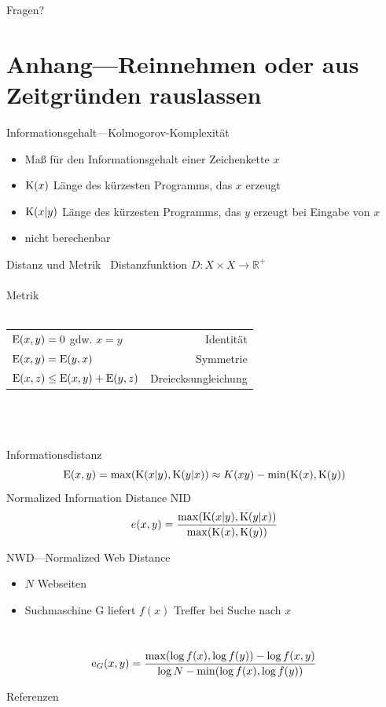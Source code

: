 \documentclass[aspectratio=1610,handout]{beamer}
\newcommand{\K}[1]{\textnormal{K}{(#1)}}
\newcommand{\E}[1]{\textnormal{E}{(#1)}}
\newcommand{\D}[1]{\textnormal{E}{(#1)}}
\newcommand{\f}[1]{\ensuremath{f(#1)}}
\begin{document}
\begin{frame}{Fragen?}
\end{frame}

\section{Anhang---Reinnehmen oder aus Zeitgründen rauslassen}

\begin{frame}{Informationsgehalt---Kolmogorov-Komplexität}
\begin{itemize}
\item Maß für den Informationsgehalt einer Zeichenkette $x$
\item $\K{x}$ Länge des kürzesten Programms, das $x$ erzeugt
\item $\K{x|y}$ Länge des kürzesten Programms, das $y$ erzeugt bei Eingabe von $x$
\item nicht berechenbar
\end{itemize}
\end{frame}

\begin{frame}{Distanz und Metrik~\cite{normalizedinformationdistance}}
Distanzfunktion $D: X \times  X \rightarrow \mathbb{R}^+$\\
\pause
~\\
Metrik\\~\\
\begin{tabular}{lr}
$\D{x,y} = 0$ gdw. $x = y$			&Identität\\
$\D{x,y} = \D{y,x}$					&Symmetrie\\
$\D{x,z} \leq \D{x,y} + \D{y,z}$	&Dreiecksungleichung\\
\end{tabular}\\
\pause
~\\~\\Informationsdistanz
\[\E{x,y} = \max(\K{x|y},\K{y|x}) \approx K(xy) - \min(\K{x},\K{y}) \]
\pause
Normalized Information Distance NID\\
\[e(x,y) = \frac{\max(\K{x|y},\K{y|x})}{\max(\K{x},\K{y})} \]
\end{frame}

\begin{frame}{NWD---Normalized Web Distance}
\begin{itemize}
\item $N$ Webseiten
\item Suchmaschine G liefert $\f{x}$ Treffer bei Suche nach $x$
\end{itemize}
~\\
\[\textnormal{e}_G(x,y) = \frac
{\max(\log \f{x}, \log \f{y})- \log \f{x,y}}
{\log N - \min(\log \f{x}, \log \f{y})}
\]
\end{frame}
 
\begin{frame}{Referenzen}


\end{frame}
\end{document}
